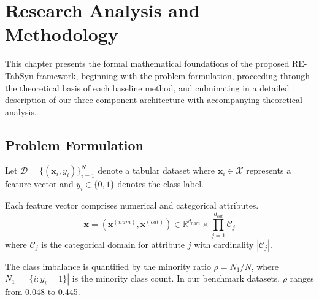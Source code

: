 \chapter{Research Analysis and Methodology}

This chapter presents the formal mathematical foundations of the proposed RE-TabSyn framework, beginning with the problem formulation, proceeding through the theoretical basis of each baseline method, and culminating in a detailed description of our three-component architecture with accompanying theoretical analysis.

\section{Problem Formulation}

Let $\mathcal{D} = \{(\mathbf{x}_i, y_i)\}_{i=1}^{N}$ denote a tabular dataset where $\mathbf{x}_i \in \mathcal{X}$ represents a feature vector and $y_i \in \{0, 1\}$ denotes the class label.

Each feature vector comprises numerical and categorical attributes.
\begin{equation}
\mathbf{x} = (\mathbf{x}^{(num)}, \mathbf{x}^{(cat)}) \in \mathbb{R}^{d_{num}} \times \prod_{j=1}^{d_{cat}} \mathcal{C}_j
\end{equation}
where $\mathcal{C}_j$ is the categorical domain for attribute $j$ with cardinality $|\mathcal{C}_j|$.

The class imbalance is quantified by the minority ratio $\rho = N_1 / N$, where $N_1 = |\{i : y_i = 1\}|$ is the minority class count. In our benchmark datasets, $\rho$ ranges from 0.048 to 0.445.


